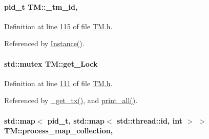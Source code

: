 \paragraph[{\texorpdfstring{\+\_\+tm\+\_\+id}{_tm_id}}]{\setlength{\rightskip}{0pt plus 5cm}pid\+\_\+t T\+M\+::\+\_\+tm\+\_\+id\hspace{0.3cm}{\ttfamily [static]}, {\ttfamily [private]}}\hypertarget{class_t_m_a9d49d0ddef82337e54b684c9e1e8ad21_a9d49d0ddef82337e54b684c9e1e8ad21}{}\label{class_t_m_a9d49d0ddef82337e54b684c9e1e8ad21_a9d49d0ddef82337e54b684c9e1e8ad21}


Definition at line \hyperlink{_t_m_8h_source_l00115}{115} of file \hyperlink{_t_m_8h_source}{T\+M.\+h}.



Referenced by \hyperlink{_t_m_8cpp_source_l00031}{Instance()}.

\paragraph[{\texorpdfstring{get\+\_\+\+Lock}{get_Lock}}]{\setlength{\rightskip}{0pt plus 5cm}std\+::mutex T\+M\+::get\+\_\+\+Lock\hspace{0.3cm}{\ttfamily [private]}}\hypertarget{class_t_m_a123bc5aa0766a7b909bebc54a429e5b0_a123bc5aa0766a7b909bebc54a429e5b0}{}\label{class_t_m_a123bc5aa0766a7b909bebc54a429e5b0_a123bc5aa0766a7b909bebc54a429e5b0}


Definition at line \hyperlink{_t_m_8h_source_l00111}{111} of file \hyperlink{_t_m_8h_source}{T\+M.\+h}.



Referenced by \hyperlink{_t_m_8cpp_source_l00081}{\+\_\+get\+\_\+tx()}, and \hyperlink{_t_m_8cpp_source_l00132}{print\+\_\+all()}.

\paragraph[{\texorpdfstring{process\+\_\+map\+\_\+collection}{process_map_collection}}]{\setlength{\rightskip}{0pt plus 5cm}std\+::map$<$ pid\+\_\+t, std\+::map$<$ std\+::thread\+::id, int $>$ $>$ T\+M\+::process\+\_\+map\+\_\+collection\hspace{0.3cm}{\ttfamily [static]}, {\ttfamily [private]}}\hypertarget{class_t_m_a6d417b18213968da2a70a914e80d639b_a6d417b18213968da2a70a914e80d639b}{}\label{class_t_m_a6d417b18213968da2a70a914e80d639b_a6d417b18213968da2a70a914e80d639b}


